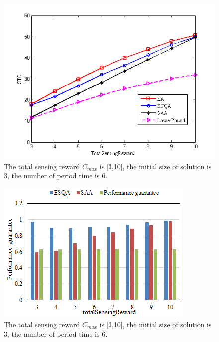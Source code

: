 \documentclass[journal]{IEEEtran}
\begin{document}
\begin{figure}
	\centering
	\includegraphics[width=1\linewidth]{Fig4(a).png}
	\caption{The total sensing reward $C_{max}$ is [3,10], the initial size of solution is 3, the number of period time is 6.}
	\label{fig:figure4}
\end{figure}
\begin{figure}
	\centering
	\includegraphics[width=1\linewidth]{Fig4(b).png}
	\caption{The total sensing reward $C_{max}$ is [3,10], the initial size of solution is 3, the number of period time is 6.}
	\label{fig:figure6}
\end{figure}
\end{document}
